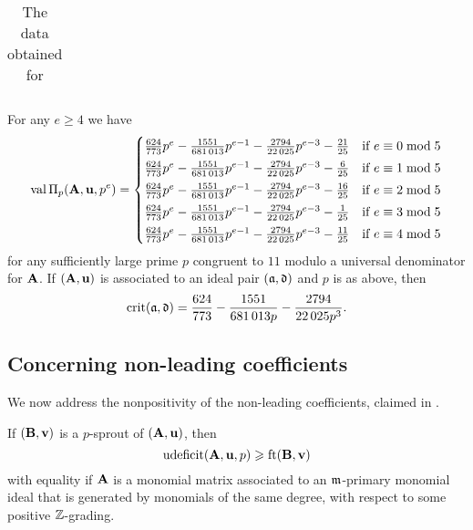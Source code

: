 \documentclass{amsart}
\begin{document}
\begin{example}
\begin{table}
\begin{center}
\begin{tabular}{cccc}
         \end{tabular}
         \endgroup
      \end{center}
      \caption{The data obtained for }
      \label{table: new example data}
   \end{table}
   For any $e\ge 4$ we have
   \[
      \operatorname{val}\Pi_p(\mathbf{A},\mathbf{u},p^e) =
      \begin{cases}
         \frac{624}{773}p^{e} - \frac{\num{1551}}{\num{681013}}p^{e-1} - \frac{\num{2794}}{\num{22025}}p^{e-3} - \frac{21}{25} & \text{if $e \equiv 0 \bmod 5$}\\[1mm]
         \frac{624}{773}p^{e} - \frac{\num{1551}}{\num{681013}}p^{e-1} - \frac{\num{2794}}{\num{22025}}p^{e-3} - \frac{6}{25} & \text{if $e \equiv 1 \bmod 5$}\\[1mm]
         \frac{624}{773}p^{e} - \frac{\num{1551}}{\num{681013}}p^{e-1} - \frac{\num{2794}}{\num{22025}}p^{e-3} - \frac{16}{25} & \text{if $e \equiv 2 \bmod 5$}\\[1mm]
         \frac{624}{773}p^{e} - \frac{\num{1551}}{\num{681013}}p^{e-1} - \frac{\num{2794}}{\num{22025}}p^{e-3} - \frac{1}{25} & \text{if $e \equiv 3 \bmod 5$}\\[1mm]
         \frac{624}{773}p^{e} - \frac{\num{1551}}{\num{681013}}p^{e-1} - \frac{\num{2794}}{\num{22025}}p^{e-3} - \frac{11}{25} & \text{if $e \equiv 4 \bmod 5$}
      \end{cases}
   \]
   for any sufficiently large prime $p$ congruent to $11$ modulo a universal denominator for $\mathbf{A}$.
   If $(\mathbf{A},\mathbf{u})$ is associated to an ideal pair $(\mathfrak{a},\mathfrak{d})$ and $p$ is as above, then
   \[\operatorname{crit}(\mathfrak{a},\mathfrak{d}) = \frac{624}{773} - \frac{\num{1551}}{\num{681013} p} - \frac{\num{2794}}{\num{22025} p^3}.\]
\end{example}

\subsection{Concerning non-leading coefficients}

We now address the nonpositivity of the non-leading coefficients, claimed in .

\begin{lemma}
   \label{non-leading coefficients: L}
   If $(\mathbf{B}, \mathbf{v})$ is a $p$-sprout of $(\mathbf{A}, \mathbf{u})$, then
   \[
      \operatorname{udeficit}(\mathbf{A}, \mathbf{u}, p) \geqslant \operatorname{ft}(\mathbf{B}, \mathbf{v})
   \]
   with equality if $\mathbf{A}$ is a monomial matrix associated to an $\mathfrak{m}$-primary monomial ideal that is generated by monomials of the same degree, with respect to some positive $\mathbb{Z}$-grading.
\end{lemma}
\end{document}
